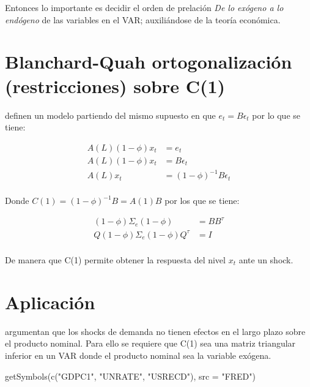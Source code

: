 \documentclass[
]{book}
\newenvironment{Shaded}{\begin{snugshade}}{\end{snugshade}}
\newcommand{\AttributeTok}[1]{\textcolor[rgb]{0.77,0.63,0.00}{#1}}
\newcommand{\FunctionTok}[1]{\textcolor[rgb]{0.00,0.00,0.00}{#1}}
\newcommand{\NormalTok}[1]{#1}
\newcommand{\StringTok}[1]{\textcolor[rgb]{0.31,0.60,0.02}{#1}}
\begin{document}
Entonces lo importante es decidir el orden de prelación \emph{De lo exógeno a lo endógeno} de las variables en el VAR; auxiliándose de la teoría económica.

\hypertarget{blanchard-quah-ortogonalizaciuxf3n-restricciones-sobre-c1}{%
\section{Blanchard-Quah ortogonalización (restricciones) sobre C(1)}\label{blanchard-quah-ortogonalizaciuxf3n-restricciones-sobre-c1}}

\citet{BLANCHARD88} definen un modelo partiendo del mismo supuesto en que \(e_{t}=B\epsilon_{t}\) por lo que se tiene:

\begin{align}
A(L)(1-\phi)x_{t}&=e_{t}\\
A(L)(1-\phi)x_{t}&=B\epsilon_{t}\\
A(L)x_{t}&=(1-\phi)^{-1}B\epsilon_{t}\\
\end{align}

Donde \(C(1)=(1-\phi)^{-1}B=A(1)B\) por los que se tiene:

\begin{align}
(1-\phi)\Sigma_{e}(1-\phi)&=BB^{\tau}\\
Q(1-\phi)\Sigma_e(1-\phi)Q^{\tau}&=I\\
\end{align}

De manera que C(1) permite obtener la respuesta del nivel \(x_{t}\) ante un shock.

\hypertarget{aplicaciuxf3n-blanchard88}{%
\section{\texorpdfstring{Aplicación \citet{BLANCHARD88}}{Aplicación @BLANCHARD88}}\label{aplicaciuxf3n-blanchard88}}

\citet{BLANCHARD88} argumentan que los shocks de demanda no tienen efectos en el largo plazo sobre el producto nominal. Para ello se requiere que C(1) sea una matriz triangular inferior en un VAR donde el producto nominal sea la variable exógena.

\begin{Shaded}
\begin{Highlighting}[]
\FunctionTok{getSymbols}\NormalTok{(}\FunctionTok{c}\NormalTok{(}\StringTok{"GDPC1"}\NormalTok{, }\StringTok{"UNRATE"}\NormalTok{, }\StringTok{"USRECD"}\NormalTok{),}
           \AttributeTok{src =} \StringTok{"FRED"}\NormalTok{)}
\end{Highlighting}
\end{Shaded}
\end{document}
